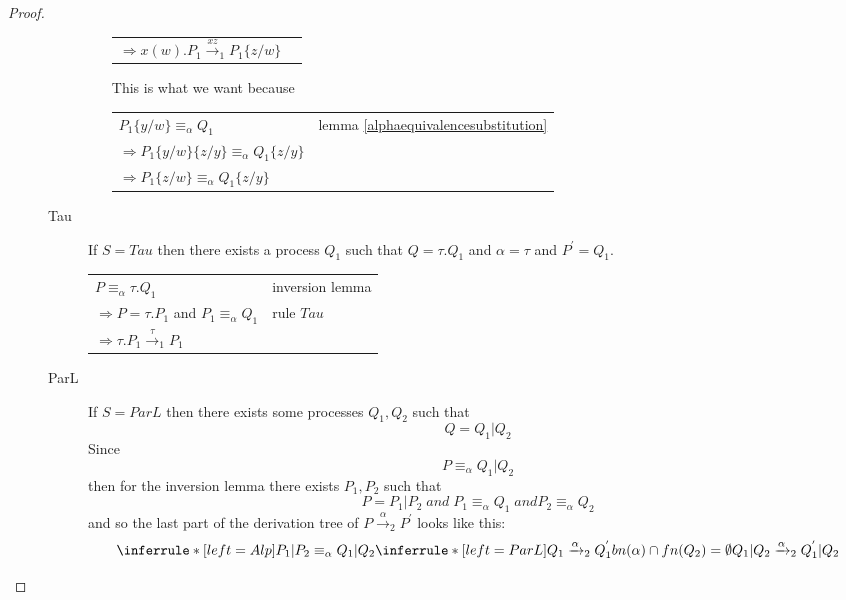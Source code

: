 \begin{theorem}
\begin{proof}
\begin{description}
\begin{description}
\begin{itemize}
\begin{center}
\begin{tabular}{ll}
		    $\Rightarrow x(w).P_{1}\xrightarrow{x z}_{1}P_{1}\{z/w\}$& \\
		  \end{tabular}
		\end{center}
		This is what we want because 
		\begin{center}
		  \begin{tabular}{ll}
		      $P_{1}\{y/w\}\equiv_{\alpha}Q_{1}$
		    &
		      lemma \ref{alphaequivalencesubstitution}
		  \\
		      $\Rightarrow P_{1}\{y/w\}\{z/y\}\equiv_{\alpha}Q_{1}\{z/y\}$
		    &
		      
		  \\
		      $\Rightarrow P_{1}\{z/w\}\equiv_{\alpha}Q_{1}\{z/y\}$
		    &
		      
		  \\
		  \end{tabular}
		\end{center}		
	    \end{itemize}
	  \item[Tau]
	    If $S=Tau$ then there exists a process $Q_{1}$ such that $Q=\tau.Q_{1}$ and $\alpha=\tau$ and $P^{'}=Q_{1}$. 
	    \begin{center}
	      \begin{tabular}{ll}
		$P\equiv_{\alpha}\tau.Q_{1}$&inversion lemma\\
		$\Rightarrow P=\tau.P_{1}$ and $P_{1}\equiv_{\alpha}Q_{1}$& rule $Tau$\\
		$\Rightarrow \tau.P_{1}\xrightarrow{\tau}_{1}P_{1}$& \\
	      \end{tabular}
	    \end{center}
	  \item[ParL]
	    If $S=ParL$ then there exists some processes $Q_{1},Q_{2}$ such that 
	    \[
	      Q=Q_{1}|Q_{2}
	    \]
	    Since 
	    \[
	      P\equiv_{\alpha}Q_{1}|Q_{2}
	    \]
	    then for the inversion lemma there exists $P_{1},P_{2}$ such that 
	    \[
	      P=P_{1}|P_{2}\; and\; P_{1}\equiv_{\alpha}Q_{1}\; and P_{2}\equiv_{\alpha}Q_{2}
	    \]
	    and so the last part of the derivation tree of $P\xrightarrow{\alpha}_{2}P^{'}$ looks like this:
	    \[
	      \inferrule* [left=Alp]{
		  P_{1}|P_{2}\equiv_{\alpha}Q_{1}|Q_{2}
		\\
		  \inferrule* [left=ParL]{
		      Q_{1}\xrightarrow{\alpha}_{2}Q_{1}^{'}
		    \\
		      bn(\alpha)\cap fn(Q_{2})=\emptyset
		  }{
		    Q_{1}|Q_{2}\xrightarrow{\alpha}_{2}Q_{1}^{'}|Q_{2}
}}\]
\end{description}
\end{description}
\end{proof}
\end{theorem}
